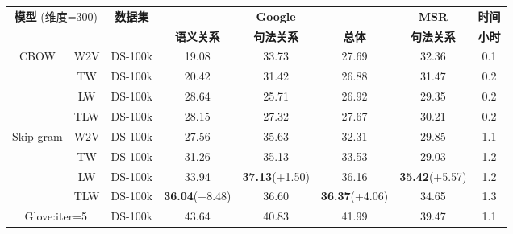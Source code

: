 \documentclass[master]{njuthesis}
\begin{document}
\begin{itemize}
\begin{table}[htbp]
\begin{center}
\small
\begin{tabular}{|c|c|c|c|c|c|c|c|}
\hline
\multicolumn{2}{|c|}{\multirow{2}{*}{\textbf{模型} (维度=300)}} & \multirow{2}{*}{\textbf{数据集}} & \multicolumn{3}{c|}{\textbf{Google}}                      & \textbf{MSR}       & \textbf{时间} \\ \cline{4-8} 
\multicolumn{2}{|c|}{}                                 &                       & \textbf{语义关系} & \textbf{句法关系} & \textbf{总体}   & \textbf{句法关系} & \textbf{小时} \\ \hline
\multirow{4}{*}{CBOW}                   & W2V          & DS-100k             & 19.08           & 33.73            & 27.69          & 32.36            & 0.1             \\ \cline{2-8} 
                                        & TW           & DS-100k             & 20.42           & 31.42            & 26.88          & 31.47            & 0.2             \\ \cline{2-8} 
                                        & LW           & DS-100k             & 28.64           & 25.71            & 26.92          & 29.35            & 0.2             \\ \cline{2-8} 
                                        & TLW          & DS-100k             & 28.15           & 27.32            & 27.67          & 30.21            & 0.2             \\ \hline
\multirow{4}{*}{Skip-gram}              & W2V          & DS-100k             & 27.56           & 35.63            & 32.31          & 29.85            & 1.1            \\ \cline{2-8} 
                                        & TW           & DS-100k             & 31.26           & 35.13            & 33.53          & 29.03            & 1.2            \\ \cline{2-8} 
                                        & LW           & DS-100k             & 33.94           & \textbf{37.13}(+1.50)    & 36.16          & \textbf{35.42}(+5.57)    & 1.2            \\ \cline{2-8} 
                                        & TLW          & DS-100k             & \textbf{36.04}(+8.48)   & 36.60            & \textbf{36.37}(+4.06)  & 34.65            & 1.3            \\ \hline
\multicolumn{2}{|c|}{Glove:iter=5} 							 & DS-100k             & 43.64           & 40.83             & 41.99          & 39.47             & 1.1            \\ \hline 	

\end{tabular}
\end{center}
\end{table}
\end{itemize}
\end{document}
